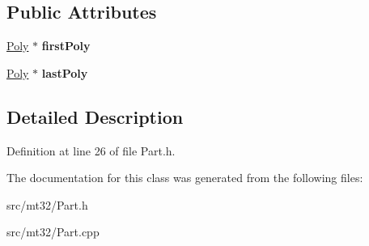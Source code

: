 \subsection*{Public Attributes}
\begin{DoxyCompactItemize}
\item 
\hypertarget{classMT32Emu_1_1PolyList_a25b48afe3e5f2908762430b17cda8982}{\hyperlink{classMT32Emu_1_1Poly}{Poly} $\ast$ {\bfseries first\-Poly}}\label{classMT32Emu_1_1PolyList_a25b48afe3e5f2908762430b17cda8982}

\item 
\hypertarget{classMT32Emu_1_1PolyList_ac7844e4272cdb6ee719315880a4a79ff}{\hyperlink{classMT32Emu_1_1Poly}{Poly} $\ast$ {\bfseries last\-Poly}}\label{classMT32Emu_1_1PolyList_ac7844e4272cdb6ee719315880a4a79ff}

\end{DoxyCompactItemize}


\subsection{Detailed Description}


Definition at line 26 of file Part.\-h.



The documentation for this class was generated from the following files\-:\begin{DoxyCompactItemize}
\item 
src/mt32/Part.\-h\item 
src/mt32/Part.\-cpp\end{DoxyCompactItemize}
